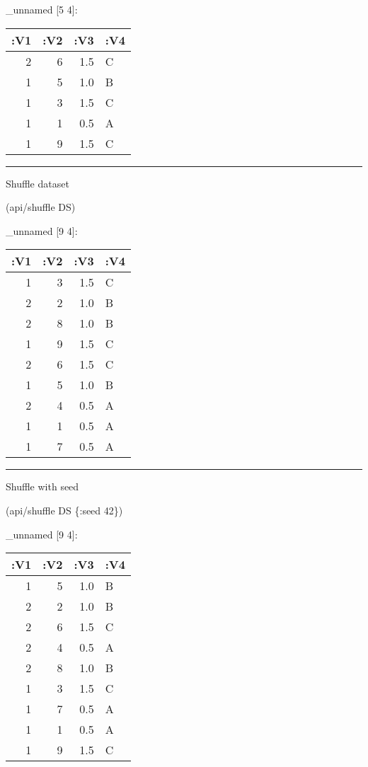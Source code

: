 \documentclass[]{article}
\newenvironment{Shaded}{\begin{snugshade}}{\end{snugshade}}
\newcommand{\DecValTok}[1]{\textcolor[rgb]{0.00,0.00,0.81}{#1}}
\newcommand{\AttributeTok}[1]{\textcolor[rgb]{0.77,0.63,0.00}{#1}}
\newcommand{\NormalTok}[1]{#1}
\begin{document}
\_unnamed {[}5 4{]}:

\begin{longtable}[]{@{}rrrl@{}}
\toprule
:V1 & :V2 & :V3 & :V4\tabularnewline
\midrule
\endhead
2 & 6 & 1.5 & C\tabularnewline
1 & 5 & 1.0 & B\tabularnewline
1 & 3 & 1.5 & C\tabularnewline
1 & 1 & 0.5 & A\tabularnewline
1 & 9 & 1.5 & C\tabularnewline
\bottomrule
\end{longtable}

\begin{center}\rule{0.5\linewidth}{0.5pt}\end{center}

Shuffle dataset

\begin{Shaded}
\begin{Highlighting}[]
\NormalTok{(api/shuffle DS)}
\end{Highlighting}
\end{Shaded}

\_unnamed {[}9 4{]}:

\begin{longtable}[]{@{}rrrl@{}}
\toprule
:V1 & :V2 & :V3 & :V4\tabularnewline
\midrule
\endhead
1 & 3 & 1.5 & C\tabularnewline
2 & 2 & 1.0 & B\tabularnewline
2 & 8 & 1.0 & B\tabularnewline
1 & 9 & 1.5 & C\tabularnewline
2 & 6 & 1.5 & C\tabularnewline
1 & 5 & 1.0 & B\tabularnewline
2 & 4 & 0.5 & A\tabularnewline
1 & 1 & 0.5 & A\tabularnewline
1 & 7 & 0.5 & A\tabularnewline
\bottomrule
\end{longtable}

\begin{center}\rule{0.5\linewidth}{0.5pt}\end{center}

Shuffle with seed

\begin{Shaded}
\begin{Highlighting}[]
\NormalTok{(api/shuffle DS \{}\AttributeTok{:seed} \DecValTok{42}\NormalTok{\})}
\end{Highlighting}
\end{Shaded}

\_unnamed {[}9 4{]}:

\begin{longtable}[]{@{}rrrl@{}}
\toprule
:V1 & :V2 & :V3 & :V4\tabularnewline
\midrule
\endhead
1 & 5 & 1.0 & B\tabularnewline
2 & 2 & 1.0 & B\tabularnewline
2 & 6 & 1.5 & C\tabularnewline
2 & 4 & 0.5 & A\tabularnewline
2 & 8 & 1.0 & B\tabularnewline
1 & 3 & 1.5 & C\tabularnewline
1 & 7 & 0.5 & A\tabularnewline
1 & 1 & 0.5 & A\tabularnewline
1 & 9 & 1.5 & C\tabularnewline
\bottomrule
\end{longtable}
\end{document}
